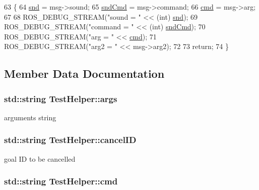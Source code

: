 \begin{DoxyCode}
63                                                \{
64     \hyperlink{classTestHelper_a299ac5a385d8e910a22980601f9ad4c4}{snd} = msg->sound;
65     \hyperlink{classTestHelper_ab91e5c0bcd313b9e629b389bbecabb90}{sndCmd} = msg->command;
66     \hyperlink{classTestHelper_ad5acc4b246653a6c073c6dc100344a86}{cmd} = msg->arg;
67 
68     ROS\_DEBUG\_STREAM(\textcolor{stringliteral}{"sound = "} <<  (\textcolor{keywordtype}{int}) \hyperlink{classTestHelper_a299ac5a385d8e910a22980601f9ad4c4}{snd});
69     ROS\_DEBUG\_STREAM(\textcolor{stringliteral}{"command = "} << (\textcolor{keywordtype}{int}) \hyperlink{classTestHelper_ab91e5c0bcd313b9e629b389bbecabb90}{sndCmd});
70     ROS\_DEBUG\_STREAM(\textcolor{stringliteral}{"arg = "} << \hyperlink{classTestHelper_ad5acc4b246653a6c073c6dc100344a86}{cmd});
71     ROS\_DEBUG\_STREAM(\textcolor{stringliteral}{"arg2 = "} << msg->arg2);
72 
73     \textcolor{keywordflow}{return};
74 \}
\end{DoxyCode}


\subsection{Member Data Documentation}
\hypertarget{classTestHelper_a7ab9b6d8f65899ab6c99dfa1538bad30}{
\subsubsection[{args}]{\setlength{\rightskip}{0pt plus 5cm}std\-::string Test\-Helper\-::args}}\label{classTestHelper_a7ab9b6d8f65899ab6c99dfa1538bad30}


arguments string 

\hypertarget{classTestHelper_afc27bc11999e9ca916e1983f2355a69e}{
\subsubsection[{cancel\-I\-D}]{\setlength{\rightskip}{0pt plus 5cm}std\-::string Test\-Helper\-::cancel\-I\-D}}\label{classTestHelper_afc27bc11999e9ca916e1983f2355a69e}


goal I\-D to be cancelled 

\hypertarget{classTestHelper_ad5acc4b246653a6c073c6dc100344a86}{
\subsubsection[{cmd}]{\setlength{\rightskip}{0pt plus 5cm}std\-::string Test\-Helper\-::cmd}}\label{classTestHelper_ad5acc4b246653a6c073c6dc100344a86}


